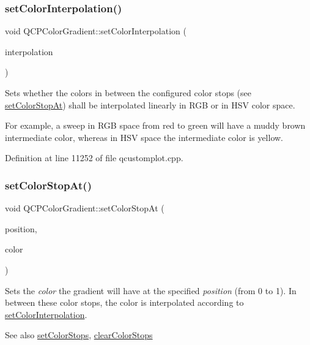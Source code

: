 \subsubsection{\texorpdfstring{set\+Color\+Interpolation()}{setColorInterpolation()}}
{\footnotesize\ttfamily void Q\+C\+P\+Color\+Gradient\+::set\+Color\+Interpolation (\begin{DoxyParamCaption}\item[{\hyperlink{class_q_c_p_color_gradient_ac5dca17cc24336e6ca176610e7f77fc1}{Q\+C\+P\+Color\+Gradient\+::\+Color\+Interpolation}}]{interpolation }\end{DoxyParamCaption})}

Sets whether the colors in between the configured color stops (see \hyperlink{class_q_c_p_color_gradient_a3b48be5e78079db1bb2a1188a4c3390e}{set\+Color\+Stop\+At}) shall be interpolated linearly in R\+GB or in H\+SV color space.

For example, a sweep in R\+GB space from red to green will have a muddy brown intermediate color, whereas in H\+SV space the intermediate color is yellow. 

Definition at line 11252 of file qcustomplot.\+cpp.

\mbox{\label{class_q_c_p_color_gradient_a3b48be5e78079db1bb2a1188a4c3390e}} 
\subsubsection{\texorpdfstring{set\+Color\+Stop\+At()}{setColorStopAt()}}
{\footnotesize\ttfamily void Q\+C\+P\+Color\+Gradient\+::set\+Color\+Stop\+At (\begin{DoxyParamCaption}\item[{double}]{position,  }\item[{const Q\+Color \&}]{color }\end{DoxyParamCaption})}

Sets the {\itshape color} the gradient will have at the specified {\itshape position} (from 0 to 1). In between these color stops, the color is interpolated according to \hyperlink{class_q_c_p_color_gradient_aa13fda86406e1d896a465a409ae63b38}{set\+Color\+Interpolation}.

\begin{DoxySeeAlso}{See also}
\hyperlink{class_q_c_p_color_gradient_a724e828aa6f0ba5011a9392477c35d3a}{set\+Color\+Stops}, \hyperlink{class_q_c_p_color_gradient_a939213e85f0d1279519d555c5fcfb6ad}{clear\+Color\+Stops} 
\end{DoxySeeAlso}


